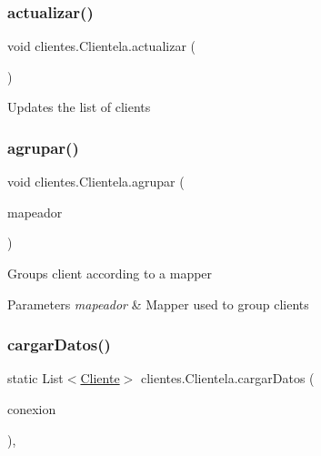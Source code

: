 \subsubsection{\texorpdfstring{actualizar()}{actualizar()}}
{\footnotesize\ttfamily void clientes.\+Clientela.\+actualizar (\begin{DoxyParamCaption}{ }\end{DoxyParamCaption})\hspace{0.3cm}{\ttfamily [inline]}}

Updates the list of clients \mbox{\label{classclientes_1_1_clientela_ae120fcd5a51e1d17d11e3b36ca1d8290}} 
\subsubsection{\texorpdfstring{agrupar()}{agrupar()}}
{\footnotesize\ttfamily void clientes.\+Clientela.\+agrupar (\begin{DoxyParamCaption}\item[{\mbox{\hyperlink{interfaceclientes_1_1_mapeador}{Mapeador}}$<$ \mbox{\hyperlink{classclientes_1_1_cliente}{Cliente}} $>$}]{mapeador }\end{DoxyParamCaption})\hspace{0.3cm}{\ttfamily [inline]}}

Groups client according to a mapper 
\begin{DoxyParams}{Parameters}
{\em mapeador} & Mapper used to group clients \\
\hline
\end{DoxyParams}
\mbox{\label{classclientes_1_1_clientela_a2892095286ae0f52220099674a8b90d8}} 
\subsubsection{\texorpdfstring{cargar\+Datos()}{cargarDatos()}}
{\footnotesize\ttfamily static List$<$\mbox{\hyperlink{classclientes_1_1_cliente}{Cliente}}$>$ clientes.\+Clientela.\+cargar\+Datos (\begin{DoxyParamCaption}\item[{\mbox{\hyperlink{classconexion_s_q_l_1_1_my_data_access}{My\+Data\+Access}}}]{conexion }\end{DoxyParamCaption})\hspace{0.3cm}{\ttfamily [inline]}, {\ttfamily [static]}}

